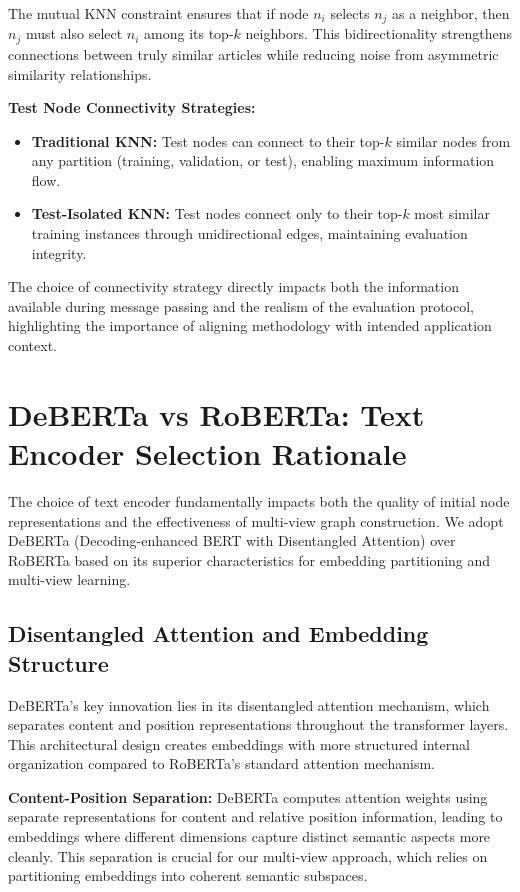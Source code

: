 The mutual KNN constraint ensures that if node $n_i$ selects $n_j$ as a neighbor, then $n_j$ must also select $n_i$ among its top-$k$ neighbors. This bidirectionality strengthens connections between truly similar articles while reducing noise from asymmetric similarity relationships.

\textbf{Test Node Connectivity Strategies:}
\begin{itemize}
    \item \textbf{Traditional KNN:} Test nodes can connect to their top-$k$ similar nodes from any partition (training, validation, or test), enabling maximum information flow.
    \item \textbf{Test-Isolated KNN:} Test nodes connect only to their top-$k$ most similar training instances through unidirectional edges, maintaining evaluation integrity.
\end{itemize}

The choice of connectivity strategy directly impacts both the information available during message passing and the realism of the evaluation protocol, highlighting the importance of aligning methodology with intended application context.

\section{DeBERTa vs RoBERTa: Text Encoder Selection Rationale}

The choice of text encoder fundamentally impacts both the quality of initial node representations and the effectiveness of multi-view graph construction. We adopt DeBERTa (Decoding-enhanced BERT with Disentangled Attention) over RoBERTa based on its superior characteristics for embedding partitioning and multi-view learning.

\subsection{Disentangled Attention and Embedding Structure}

DeBERTa's key innovation lies in its disentangled attention mechanism, which separates content and position representations throughout the transformer layers. This architectural design creates embeddings with more structured internal organization compared to RoBERTa's standard attention mechanism.

\textbf{Content-Position Separation:} DeBERTa computes attention weights using separate representations for content and relative position information, leading to embeddings where different dimensions capture distinct semantic aspects more cleanly. This separation is crucial for our multi-view approach, which relies on partitioning embeddings into coherent semantic subspaces.

